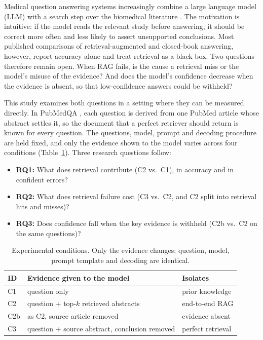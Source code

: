 \documentclass[conference]{IEEEtran}
\begin{document}
Medical question answering systems increasingly combine a large language model
(LLM) with a search step over the biomedical literature
\cite{lewis2020rag,xiong2024medrag}. The motivation is intuitive: if the model
reads the relevant study before answering, it should be correct more often and
less likely to assert unsupported conclusions. Most published comparisons of
retrieval-augmented and closed-book answering, however, report accuracy alone
and treat retrieval as a black box. Two questions therefore remain open. When
RAG fails, is the cause a retrieval miss or the model's misuse of the evidence?
And does the model's confidence decrease when the evidence is absent, so that
low-confidence answers could be withheld?

This study examines both questions in a setting where they can be measured
directly. In PubMedQA \cite{jin2019pubmedqa}, each question is derived from one
PubMed article whose abstract settles it, so the document that a perfect
retriever should return is known for every question. The questions, model,
prompt and decoding procedure are held fixed, and only the evidence shown to the
model varies across four conditions (Table~\ref{tab:conditions}). Three research
questions follow:

\begin{itemize}
\item \textbf{RQ1:} What does retrieval contribute (C2 vs.\ C1), in accuracy and
in confident errors?
\item \textbf{RQ2:} What does retrieval failure cost (C3 vs.\ C2, and C2 split
into retrieval hits and misses)?
\item \textbf{RQ3:} Does confidence fall when the key evidence is withheld (C2b
vs.\ C2 on the same questions)?
\end{itemize}

\begin{table}[t]
\centering
\caption{Experimental conditions. Only the evidence changes; question, model,
prompt template and decoding are identical.}
\label{tab:conditions}
\begin{tabular}{@{}lp{3.1cm}p{2.6cm}@{}}
\toprule
ID & Evidence given to the model & Isolates \\
\midrule
C1 & question only & prior knowledge \\
C2 & question + top-$k$ retrieved abstracts & end-to-end RAG \\
C2b & as C2, source article removed & evidence absent \\
C3 & question + source abstract, conclusion removed & perfect retrieval \\
\bottomrule
\end{tabular}
\end{table}
\end{document}
